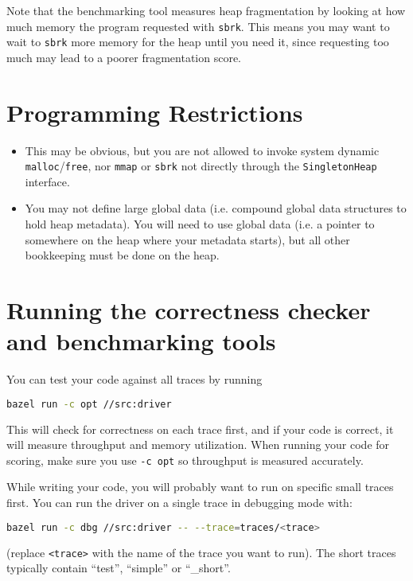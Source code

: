\documentclass{article}
\begin{document}
Note that the benchmarking tool measures heap fragmentation by looking at how much memory the program requested with \texttt{sbrk}. This means you may want to wait to \texttt{sbrk} more memory for the heap until you need it, since requesting too much may lead to a poorer fragmentation score.

\section*{Programming Restrictions}

\begin{itemize}
  \item This may be obvious, but you are not allowed to invoke system dynamic \texttt{malloc}/\texttt{free}, nor \texttt{mmap} or \texttt{sbrk} not directly through the \texttt{SingletonHeap} interface.
  \item You may not define large global data (i.e. compound global data structures to hold heap metadata). You will need to use global data (i.e. a pointer to somewhere on the heap where your metadata starts), but all other bookkeeping must be done on the heap.
\end{itemize}

\section*{Running the correctness checker and benchmarking tools}

You can test your code against all traces by running

\begin{lstlisting}[language=bash]
bazel run -c opt //src:driver
\end{lstlisting}

This will check for correctness on each trace first, and if your code is correct, it will measure throughput and memory utilization. When running your code for scoring, make sure you use \texttt{-c opt} so throughput is measured accurately.

While writing your code, you will probably want to run on specific small traces first. You can run the driver on a single trace in debugging mode with:

\begin{lstlisting}[language=bash]
bazel run -c dbg //src:driver -- --trace=traces/<trace>
\end{lstlisting}

(replace \texttt{<trace>} with the name of the trace you want to run). The short traces typically contain ``test'', ``simple'' or ``\_short''.
\end{document}
